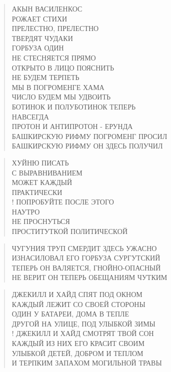\poemtitle{***}
\begin{verse}
АКЫН ВАСИЛЕНКОС\\
РОЖАЕТ СТИХИ\\
ПРЕЛЕСТНО, ПРЕЛЕСТНО\\
ТВЕРДЯТ ЧУДАКИ\\
ГОРБУЗА ОДИН\\
НЕ СТЕСНЯЕТСЯ ПРЯМО\\
ОТКРЫТО В ЛИЦО ПОЯСНИТЬ\\
НЕ БУДЕМ ТЕРПЕТЬ\\
МЫ В ПОГРОМЕНГЕ ХАМА\\
ЧИСЛО БУДЕМ МЫ УДВОИТЬ\\
БОТИНОК И ПОЛУБОТИНОК ТЕПЕРЬ\\
НАВСЕГДА\\
ПРОТОН И АНТИПРОТОН - ЕРУНДА\\
БАШКИРСКУЮ РИФМУ ПОГРОМЕНГ ПРОСИЛ\\
БАШКИРСКУЮ РИФМУ ОН ЗДЕСЬ ПОЛУЧИЛ
\end{verse}

\poemtitle{***}
\begin{verse}
ХУЙНЮ ПИСАТЬ\\
 С ВЫРАВНИВАНИЕМ \\
   МОЖЕТ КАЖДЫЙ\\
     ПРАКТИЧЕСКИ\\!
ПОПРОБУЙТЕ ПОСЛЕ ЭТОГО\\
 НАУТРО\\
   НЕ ПРОСНУТЬСЯ\\
     ПРОСТИТУТКОЙ ПОЛИТИЧЕСКОЙ
\end{verse}

\poemtitle{***}
\begin{verse}
ЧУГУНИЯ ТРУП СМЕРДИТ ЗДЕСЬ УЖАСНО\\
ИЗНАСИЛОВАЛ ЕГО ГОРБУЗА СУРГУТСКИЙ\\
ТЕПЕРЬ ОН ВАЛЯЕТСЯ, ГНОЙНО-ОПАСНЫЙ\\
НЕ ВЕРИТ ОН ТЕПЕРЬ ОБЕЩАНИЯМ ЧУТКИМ
\end{verse}

\poemtitle{***}
\begin{verse}
ДЖЕКИЛЛ И ХАЙД СПЯТ ПОД ОКНОМ\\
КАЖДЫЙ ЛЕЖИТ  СО СВОЕЙ СТОРОНЫ\\
ОДИН У БАТАРЕИ, ДОМА В ТЕПЛЕ\\
ДРУГОЙ НА УЛИЦЕ, ПОД УЛЫБКОЙ ЗИМЫ\\!
ДЖЕКИЛЛ И ХАЙД СМОТРЯТ ТВОЙ СОН\\
КАЖДЫЙ ИЗ НИХ ЕГО КРАСИТ СВОИМ\\
УЛЫБКОЙ ДЕТЕЙ, ДОБРОМ И ТЕПЛОМ\\
И ТЕРПКИМ ЗАПАХОМ МОГИЛЬНОЙ ТРАВЫ
\end{verse}

